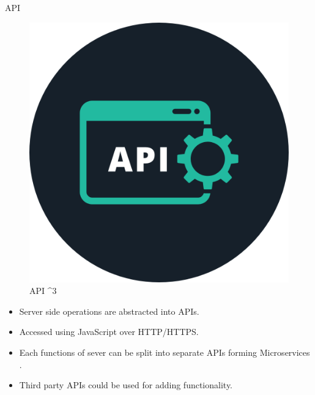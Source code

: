 \documentclass[aspectratio=169,9pt]{beamer}
\begin{document}
\begin{frame}{API}
\begin{figure}
        \begin{center}
            \includegraphics[scale=.16]{./images/api.png}
            \caption{API ^3}
        \end{center} 
    \end{figure}
\begin{itemize}
    \item Server side operations are abstracted into APIs.
    \item Accessed using JavaScript over HTTP/HTTPS.
    \item Each functions of sever can be split into separate APIs forming Microservices .
    \item Third party APIs could be used for adding functionality.
\end{itemize} 
\end{frame}
\end{document}
